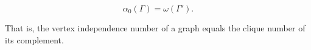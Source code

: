 $$\alpha_0(\Gamma) = \omega(\Gamma').$$

That is, the vertex independence number of a graph equals the clique number of its complement.
